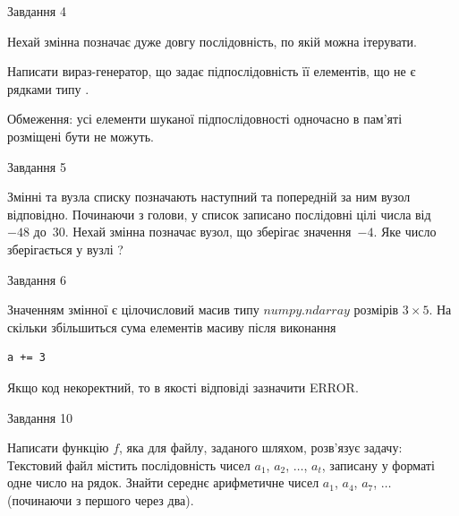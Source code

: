 \documentclass[12pt, ukrainian]{article}
\begin{document}
{\begin{minipage}[t]{8.0cm}
\end{minipage}


               
{\begin{center}Завдання {4}\end{center}}
\vspace{-4mm}
Нехай змінна  позначає дуже довгу послідовність, по якій можна ітерувати.

Написати вираз-генератор, що задає підпослідовність її елементів, що не є рядками типу .

Обмеження: усі елементи шуканої підпослідовності одночасно в пам'яті розміщені бути не можуть.\par

\vspace{10mm}
               
{\begin{center}Завдання {5}\end{center}}
\vspace{-4mm}
Змінні  та  вузла списку позначають наступний та попередній за ним вузол відповідно. Починаючи з голови, у список записано послідовні цілі числа від~$-48$ до~$30$. Нехай змінна  позначає вузол, що зберігає значення~$-4$.
Яке число зберігається у вузлі  ?\par

               
{\begin{center}Завдання {6}\end{center}}
\vspace{-4mm}
Значенням змінної  є цілочисловий масив типу $numpy.ndarray$ розмірів $3{\times}5$. На скільки збільшиться сума елементів масиву  після виконання
\begin{verbatim}
a += 3
\end{verbatim}


Якщо код некоректний, то в якості відповіді зазначити ERROR.\par

               
{\begin{center}Завдання {10}\end{center}}
\vspace{-4mm}

Написати функцію $f$, яка для файлу, заданого шляхом, розв’язує задачу:\\ Текстовий файл містить послідовність чисел $a_1$, $a_2$, $\ldots$, $a_t$, записану у форматі одне число на рядок. Знайти середнє арифметичне чисел $a_1$, $a_4$, $a_7$, $\ldots$ (починаючи з першого через два).

}
\end{document}

